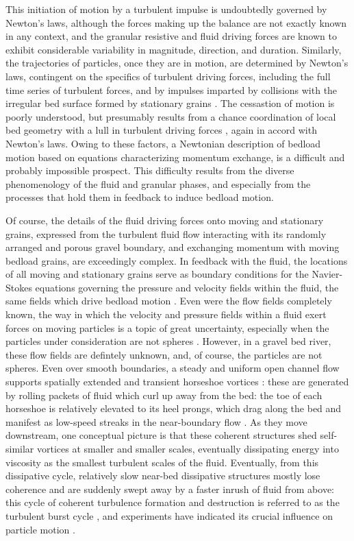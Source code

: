 \documentclass{article}
\begin{document}
{This initiation of motion by a turbulent impulse is undoubtedly governed by Newton's laws, although the forces making up the balance are not exactly known in any context, and the granular resistive \citep{Lamb2008} and fluid driving \citep{Schmeeckle2007, Celik2014, Amir2014, Shih2017} forces are known to exhibit considerable variability in magnitude, direction, and duration. 
Similarly, the trajectories of particles, once they are in motion, are determined by Newton's laws, contingent on the specifics of turbulent driving forces, including the full time series of turbulent forces, and by impulses imparted by collisions with the irregular bed surface formed by stationary grains \citep{Wiberg1985, Bialik2015}. 
The cessastion of motion is poorly understood, but presumably results from a chance coordination of local bed geometry with a lull in turbulent driving forces \citep{Pahtz2018}, again in accord with Newton's laws.  
Owing to these factors, a Newtonian description of bedload motion based on equations characterizing momentum exchange, is a difficult and probably impossible prospect. 
This difficulty results from the diverse phenomenology of the fluid and granular phases, and especially from the processes that hold them in feedback to induce bedload motion. 

Of course, the details of the fluid driving forces onto moving and stationary grains, expressed from the turbulent fluid flow interacting with its randomly arranged and porous gravel boundary, and exchanging momentum with moving bedload grains, are exceedingly complex. 
In feedback with the fluid, the locations of all moving and stationary grains serve as boundary conditions for the Navier-Stokes equations governing the pressure and velocity fields within the fluid, the same fields which drive bedload motion \citep{Nikora2013}.
Even were the flow fields completely known, the way in which the velocity and pressure fields within a fluid exert forces on moving particles is a topic of great uncertainty, especially when the particles under consideration are not spheres \citep{Maxey1983}.
However, in a gravel bed river, these flow fields are defintely unknown, and, of course, the particles are not spheres.  
Even over smooth boundaries, a steady and uniform open channel flow supports spatially extended and transient horseshoe vortices \citep{Adrian2007}: these are generated by rolling packets of fluid which curl up away from the bed: the toe of each horseshoe is relatively elevated to its heel prongs, which drag along the bed and manifest as low-speed streaks in the near-boundary flow \citep{Klein1967, Nino1998}. 
As they move downstream, one conceptual picture is that these coherent structures shed self-similar vortices at smaller and smaller scales, eventually dissipating energy into viscosity as the smallest turbulent scales of the fluid. 
Eventually, from this dissipative cycle, relatively slow near-bed dissipative structures mostly lose coherence and are suddenly swept away by a faster inrush of fluid from above: this cycle of coherent turbulence formation and destruction is referred to as the turbulent burst cycle \citep{}, and experiments have indicated its crucial influence on particle motion \citep{Nino1998, Amir2017}. 

}
\end{document}
